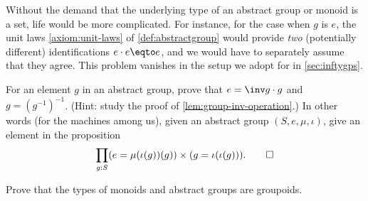 \begin{remark}\label{rem:ee=e_coherence}
  Without the demand that the underlying type of an abstract group or monoid is a set, life would be more complicated.  For instance, for the
  case when $g$ is $e$, the unit laws \ref{axiom:unit-laws} of \cref{def:abstractgroup} would provide \emph{two} (potentially different)
  identifications $e\cdot e \eqto e$, and we would have to separately assume that they agree.  This problem vanishes in the setup we adopt for
  \inftygps in \cref{sec:inftygps}.
\end{remark}

\begin{xca}
  For an element $g$ in an abstract group,
  prove that $e=\inv g\cdot g$ and $g=(g^{-1})^{-1}$. 
  (Hint: study the proof of \cref{lem:group-inv-operation}.)
  In other words (for the
  machines among us), given an abstract group $(S,e,\mu,\iota)$,
  give an element in the proposition
  \begin{displaymath}
    \prod_{g:S} (e=\mu(\iota(g))(g))\times
    (g=\iota(\iota(g))).\qedhere
  \end{displaymath}
\end{xca}

\begin{xca}\label{xca:typemonoidisgroupoid}
  Prove that the types of monoids and abstract groups are groupoids.
\end{xca}

